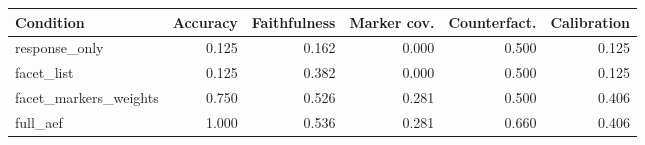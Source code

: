 \begin{tabular}{lrrrrr}
\toprule
Condition & Accuracy & Faithfulness & Marker cov. & Counterfact. & Calibration \\
\midrule
response\_only & 0.125 & 0.162 & 0.000 & 0.500 & 0.125 \\
facet\_list & 0.125 & 0.382 & 0.000 & 0.500 & 0.125 \\
facet\_markers\_weights & 0.750 & 0.526 & 0.281 & 0.500 & 0.406 \\
full\_aef & 1.000 & 0.536 & 0.281 & 0.660 & 0.406 \\
\bottomrule
\end{tabular}
